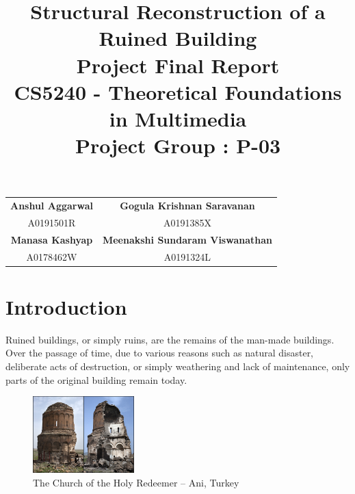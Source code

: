 \documentclass[12pt,a4paper]{article}
\title{\vspace{-1.5cm}\huge{Structural Reconstruction of a Ruined Building}\\ \vspace{0.5cm}\Large{Project Final Report}\\\vspace{0.4cm}\large{CS5240 - Theoretical Foundations in Multimedia}\\
    \large{Project Group : P-03}}
\date{}
\begin{document}
    
    \maketitle
    \vspace{-2cm}
    \begin{table}[h]
        \centering
        \begin{tabular}{cc}
            \textbf{\large{Anshul Aggarwal}} & \textbf{\large{Gogula Krishnan Saravanan}}      \vspace{0.2cm}\\
            A0191501R                & A0191385X                               \vspace{0.5cm}\\
            \textbf{\large{Manasa Kashyap}}  & \textbf{\large{Meenakshi Sundaram Viswanathan}} \vspace{0.2cm}\\
            A0178462W                & A0191324L                              
        \end{tabular}
    \end{table}
    
    
    
    \section{Introduction}
    
    Ruined buildings, or simply ruins, are the remains of the man-made buildings. Over the passage of time, due to various reasons such as natural disaster, deliberate acts of destruction, or simply weathering and lack of maintenance, only parts of the original building remain today.
    
    \begin{figure}
        \centering
        \captionsetup{justification=centering}
        
        \includegraphics[width=0.35\textwidth]{ruins.jpg}
        
        \caption{The Church of the Holy Redeemer -- Ani, Turkey}
        \label{fig:ruins}
    \end{figure}
    
\end{document}
